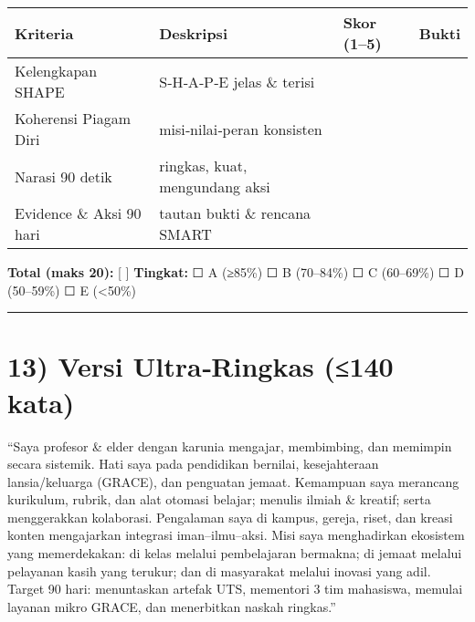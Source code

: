 \documentclass[
  letterpaper,
  DIV=11,
  numbers=noendperiod]{scrreprt}
\begin{document}
\begin{longtable}[]{@{}
  >{\raggedright\arraybackslash}p{}
  >{\raggedright\arraybackslash}p{}
  >{\raggedleft\arraybackslash}p{}
  >{\raggedright\arraybackslash}p{}@{}}
\toprule\noalign{}
\begin{minipage}[b]{\linewidth}\raggedright
Kriteria
\end{minipage} & \begin{minipage}[b]{\linewidth}\raggedright
Deskripsi
\end{minipage} & \begin{minipage}[b]{\linewidth}\raggedleft
Skor (1--5)
\end{minipage} & \begin{minipage}[b]{\linewidth}\raggedright
Bukti
\end{minipage} \\
\midrule\noalign{}
\endhead
\bottomrule\noalign{}
\endlastfoot
Kelengkapan SHAPE & S‑H‑A‑P‑E jelas \& terisi & & \\
Koherensi Piagam Diri & misi‑nilai‑peran konsisten & & \\
Narasi 90 detik & ringkas, kuat, mengundang aksi & & \\
Evidence \& Aksi 90 hari & tautan bukti \& rencana SMART & & \\
\end{longtable}

\textbf{Total (maks 20):} {[} {]} \textbf{Tingkat:} ☐ A (≥85\%) ☐ B
(70--84\%) ☐ C (60--69\%) ☐ D (50--59\%) ☐ E (\textless50\%)

\begin{center}\rule{0.5\linewidth}{0.5pt}\end{center}

\section{13) Versi Ultra‑Ringkas (≤140
kata)}\label{versi-ultraringkas-140-kata}

``Saya profesor \& elder dengan karunia mengajar, membimbing, dan
memimpin secara sistemik. Hati saya pada pendidikan bernilai,
kesejahteraan lansia/keluarga (GRACE), dan penguatan jemaat. Kemampuan
saya merancang kurikulum, rubrik, dan alat otomasi belajar; menulis
ilmiah \& kreatif; serta menggerakkan kolaborasi. Pengalaman saya di
kampus, gereja, riset, dan kreasi konten mengajarkan integrasi
iman--ilmu--aksi. Misi saya menghadirkan ekosistem yang memerdekakan: di
kelas melalui pembelajaran bermakna; di jemaat melalui pelayanan kasih
yang terukur; dan di masyarakat melalui inovasi yang adil. Target 90
hari: menuntaskan artefak UTS, mementori 3 tim mahasiswa, memulai
layanan mikro GRACE, dan menerbitkan naskah ringkas.''
\end{document}

